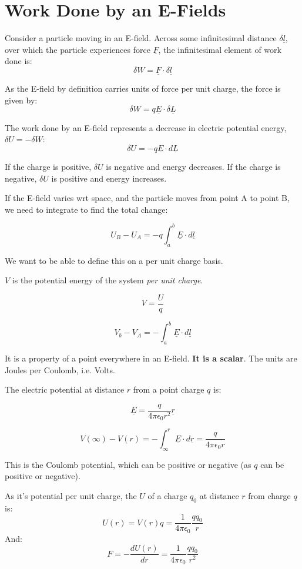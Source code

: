 \section{Work Done by an E-Fields}
Consider a particle moving in an E-field. Across some infinitesimal distance $\delta \underline{l}$, over which the particle experiences force $\underline{F}$, the infinitesimal element of work done is:
\[
    \delta W = \underline{F} \cdot \delta \underline{l}
\]

As the E-field by definition carries units of force per unit charge, the force is given by:
\[
     \delta W = q \underline{E} \cdot \delta \underline{L}
\]

The work done by an E-field represents a decrease in electric potential energy, $\delta U = - \delta W$:
\[
    \delta U = - q \underline{E} \cdot d \underline{L}
\]

If the charge is positive, $\delta U$ is negative and energy decreases. If the charge is negative, $\delta U$ is positive and energy increases.

If the E-field varies wrt space, and the particle moves from point A to point B, we need to integrate to find the total change:

\[
    U_B - U_A = -q \int_{a}^{b} \underline{E} \cdot d\underline{l}
\]

We want to be able to define this on a per unit charge basis.

\begin{tcolorbox}
    $V$ is the potential energy of the system \emph{per unit charge}.

    \[
        V = \frac{U}{q}
    \]

    \[
        V_b - V_A = - \int_{a}^{b} \underline{E} \cdot d \underline{l}
    \]

    It is a property of a point everywhere in an E-field. \textbf{It is a scalar}. The units are Joules per Coulomb, i.e. Volts.
\end{tcolorbox}

The electric potential at distance $r$ from a point charge $q$ is:

\[
    \underline{E} = \frac{q}{4 \pi \epsilon_0 r^2} \underline{r}
\]

\[
    V(\infty) - V(r) = - \int_{\infty}^{r} \underline{E} \cdot d \underline{r} = \frac{q}{4 \pi \epsilon_0 r}
\]

This is the Coulomb potential, which can be positive or negative (as $q$ can be positive or negative).

As it's potential per unit charge, the $U$ of a charge $q_0$ at distance $r$ from charge $q$ is:
\[
    U(r) = V(r)q = \frac{1}{4 \pi \epsilon_0} \frac{q q_0}{r}
\]
And:
\[
  F = - \frac{dU(r)}{dr} = \frac{1}{4 \pi \epsilon_0} \frac{q q_0}{r^2}
\]

